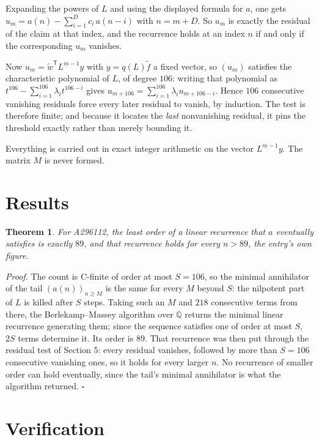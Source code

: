 \documentclass[11pt]{article}
\newtheorem{theorem}{Theorem}
\theoremstyle{definition}
\begin{document}
Expanding the powers of $L$ and using the displayed formula for $a$, one gets $u_m = a(n) - \sum_{i=1}^{D} c_i\,a(n-i)$ with $n = m + D$. So $u_m$ is exactly the residual of the claim at that index, and the recurrence holds at an index $n$ if and only if the corresponding $u_m$ vanishes.

Now $u_m = \tilde w^{\mathsf T} L^{m-1} y$ with $y = q(L)\tilde f$ a fixed vector, so $(u_m)$ satisfies the characteristic polynomial of $L$, of degree $106$: writing that polynomial as $t^{106} - \sum_{i=1}^{106} \lambda_i t^{106-i}$ gives $u_{m+106} = \sum_{i=1}^{106} \lambda_i u_{m+106-i}$. Hence $106$ consecutive vanishing residuals force every later residual to vanish, by induction. The test is therefore finite; and because it locates the {\itshape last} nonvanishing residual, it pins the threshold exactly rather than merely bounding it.

Everything is carried out in exact integer arithmetic on the vector $L^{m-1}y$. The matrix $M$ is never formed.

\section{Results}

\begin{theorem} For A296112, the least order of a linear recurrence that $a$ eventually satisfies is exactly $89$, and that recurrence holds for every $n > 89$, the entry's own figure.\end{theorem}

{\itshape Proof.} The count is C-finite of order at most $S = 106$, so the minimal annihilator of the tail $(a(n))_{n \ge M}$ is the same for every $M$ beyond $S$: the nilpotent part of $L$ is killed after $S$ steps. Taking such an $M$ and $218$ consecutive terms from there, the Berlekamp--Massey algorithm over $\mathbb{Q}$ returns the minimal linear recurrence generating them; since the sequence satisfies one of order at most $S$, $2S$ terms determine it. Its order is $89$. That recurrence was then put through the residual test of Section 5: every residual vanishes, followed by more than $S = 106$ consecutive vanishing ones, so it holds for every larger $n$. No recurrence of smaller order can hold eventually, since the tail's minimal annihilator is what the algorithm returned. $\square$

\section{Verification}
\end{document}

